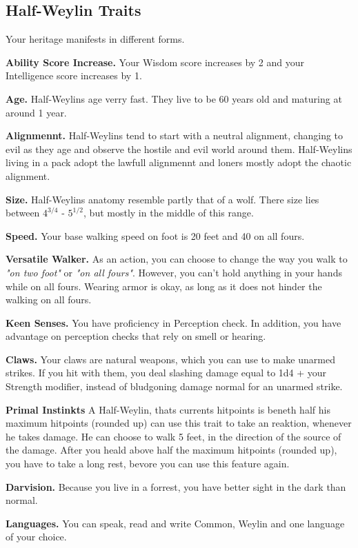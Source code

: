 \documentclass[10pt,twoside,twocolumn,openany]{book}
\begin{document}
\subsection{Half-Weylin Traits}
Your heritage manifests in different forms.

\textbf{Ability Score Increase.} Your Wisdom score increases by 2 and your Intelligence score increases by 1.

\textbf{Age.} Half-Weylins age verry fast. They live to be 60 years old and maturing at around 1 year.

\textbf{Alignmennt.} Half-Weylins tend to start with a neutral alignment, changing to evil as they age and observe the hostile and evil world around them. Half-Weylins living in a pack adopt the lawfull alignmennt and loners mostly adopt the chaotic alignment.

\textbf{Size.} Half-Weylins anatomy resemble partly that of a wolf. There size lies between $4^{3/4}$ - $5^{1/2}$, but mostly in the middle of this range.

\textbf{Speed.} Your base walking speed on foot is 20 feet and 40 on all fours.

\textbf{Versatile Walker.} As an action, you can choose to change the way you walk to \textit{"on two foot"} or \textit{"on all fours"}. However, you can't hold anything in your hands while on all fours. Wearing armor is okay, as long as it does not hinder the walking on all fours.

\textbf{Keen Senses.} You have proficiency in Perception check. In addition, you have advantage on perception checks that rely on smell or hearing.

\textbf{Claws.} Your claws are natural weapons, which you can use to make unarmed strikes. If you hit with them, you deal slashing damage equal to 1d4 + your Strength modifier, instead of bludgoning damage normal for an unarmed strike.

\textbf{Primal Instinkts} A Half-Weylin, thats currents hitpoints is beneth half his maximum hitpoints (rounded up) can use this trait to take an reaktion, whenever he takes damage. He can choose to walk 5 feet, in the direction of the source of the damage. After you heald above half the maximum hitpoints (rounded up), you have to take a long rest, bevore you can use this feature again.

\textbf{Darvision.} Because you live in a forrest, you have better sight in the dark than normal. 

\textbf{Languages.} You can speak, read and write Common, Weylin and one language of your choice.
\end{document}
